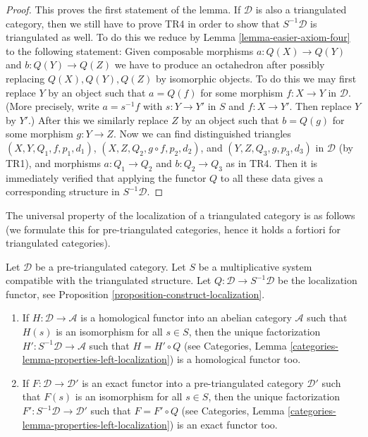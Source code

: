 \begin{proof}
\medskip\noindent
This proves the first statement of the lemma. If $\mathcal{D}$ is also
a triangulated category, then we still have to prove TR4 in order to show
that $S^{-1}\mathcal{D}$ is triangulated as well. To do this we reduce by
Lemma \ref{lemma-easier-axiom-four}
to the following statement: Given composable morphisms
$a : Q(X) \to Q(Y)$ and $b : Q(Y) \to Q(Z)$ we have to produce
an octahedron after possibly replacing $Q(X), Q(Y), Q(Z)$ by isomorphic
objects. To do this we may first replace $Y$ by an object such that
$a = Q(f)$ for some morphism $f : X \to Y$ in $\mathcal{D}$. (More precisely,
write $a = s^{-1}f$ with $s : Y \to Y'$ in $S$ and $f : X \to Y'$. Then
replace $Y$ by $Y'$.) After this we similarly replace $Z$ by an object such
that $b = Q(g)$ for some morphism $g : Y \to Z$. Now we can find
distinguished triangles $(X, Y, Q_1, f, p_1, d_1)$,
$(X, Z, Q_2, g \circ f, p_2, d_2)$, and
$(Y, Z, Q_3, g, p_3, d_3)$ in $\mathcal{D}$ (by TR1), and
morphisms $a : Q_1 \to Q_2$ and $b : Q_2 \to Q_3$ as in TR4.
Then it is immediately verified that applying the functor $Q$ to
all these data gives a corresponding structure in $S^{-1}\mathcal{D}$.
\end{proof}

\noindent
The universal property of the localization of a triangulated category
is as follows (we formulate this for pre-triangulated categories, hence
it holds a fortiori for triangulated categories).

\begin{lemma}
\label{lemma-universal-property-localization}
Let $\mathcal{D}$ be a pre-triangulated category. Let $S$ be a multiplicative
system compatible with the triangulated structure. Let
$Q : \mathcal{D} \to S^{-1}\mathcal{D}$ be the localization functor, see
Proposition \ref{proposition-construct-localization}.
\begin{enumerate}
\item If $H : \mathcal{D} \to \mathcal{A}$ is a homological functor into
an abelian category $\mathcal{A}$ such that $H(s)$ is an isomorphism for
all $s \in S$, then the unique factorization
$H' : S^{-1}\mathcal{D} \to \mathcal{A}$ such that $H = H' \circ Q$ (see
Categories, Lemma \ref{categories-lemma-properties-left-localization})
is a homological functor too.
\item If $F : \mathcal{D} \to \mathcal{D}'$ is an exact functor into
a pre-triangulated category $\mathcal{D}'$ such that $F(s)$ is an isomorphism
for all $s \in S$, then the unique factorization
$F' : S^{-1}\mathcal{D} \to \mathcal{D}'$ such that $F = F' \circ Q$ (see
Categories, Lemma \ref{categories-lemma-properties-left-localization})
is an exact functor too.
\end{enumerate}
\end{lemma}

